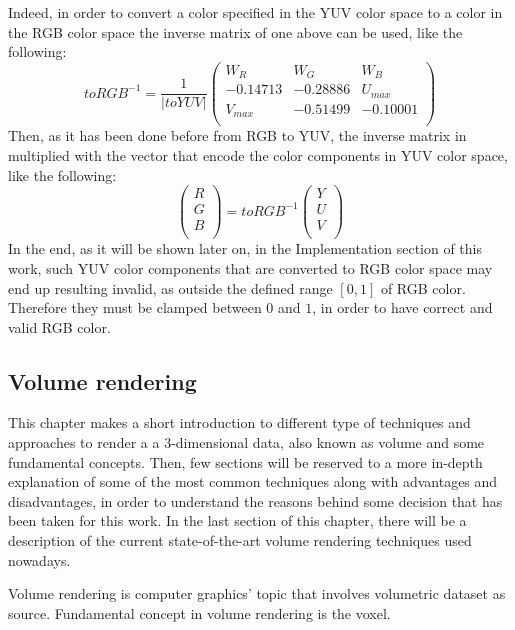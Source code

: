 \documentclass[12pt,a4paper]{extarticle}
\newcommand{\linespace}{\vspace{8pt}}
\begin{document}
Indeed, in order to convert a color specified in the YUV color space to a color in the RGB color space the inverse matrix of one above can be used, like the following:
\[
toRGB^{-1} = \frac{1}{|toYUV|}
\begin{pmatrix}
W_{R} & W_{G} & W_{B}\\
-0.14713 & -0.28886 & U_{max}\\
V_{max} & -0.51499& -0.10001\\
\end{pmatrix}
\]
Then, as it has been done before from RGB to YUV, the inverse matrix in multiplied with the vector that encode the color components in YUV color space, like the following:
\[
\begin{pmatrix}
 R\\
 G\\
 B\\
\end{pmatrix}
=
toRGB^{-1}
\begin{pmatrix}
Y\\
U\\
V\\
\end{pmatrix}
\]
In the end, as it will be shown later on, in the Implementation section of this work, such YUV color components that are converted to RGB color space may end up resulting invalid, as outside the defined range $[0,1]$ of RGB color. Therefore they must be clamped between $0$ and $1$, in order to have correct and valid RGB color.

\pagebreak
\subsection{Volume rendering} 
This chapter makes a short introduction to different type of techniques and approaches to render a a 3-dimensional data, also known as volume and some fundamental concepts. Then, few sections will be reserved to a more in-depth explanation of some of the most common techniques along with advantages and disadvantages, in order to understand the reasons behind some decision that has been taken for this work. In the last section of this chapter, there will be a description of the current state-of-the-art volume rendering techniques used nowadays.
\linespace

Volume rendering is  computer graphics' topic that involves volumetric dataset as source. Fundamental concept in volume rendering is the voxel. 
\end{document}

